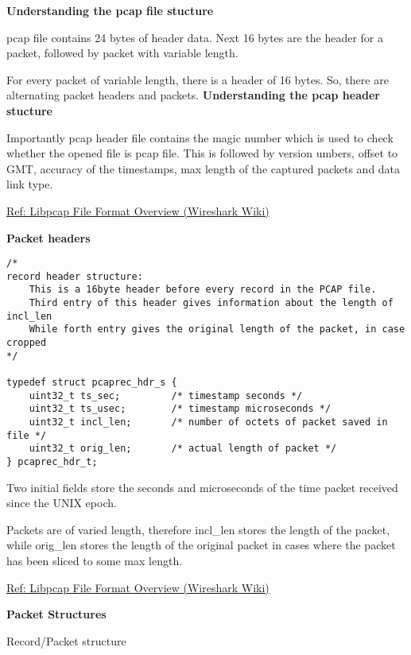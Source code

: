 \documentclass[12pt, a4paper]{report}
\begin{document}
\textbf{Understanding the pcap file stucture}

pcap file contains 24 bytes of header data. Next 16 bytes are the header for a packet, followed by packet with variable length. 

For every packet of variable length, there is a header of 16 bytes. So, there are alternating packet headers and packets.
\newpage
\textbf{Understanding the pcap header stucture}

Importantly pcap header file contains the magic number which is used to check whether the opened file is pcap file.
\newline 
This is followed by version umbers, offset to GMT, accuracy of the timestamps, max length of the captured packets and data link type.

\noindent\href{https://wiki.wireshark.org/Development/LibpcapFileFormat\#overview}{Ref: Libpcap File Format Overview (Wireshark Wiki)}

\vspace{1em}
\textbf{Packet headers}

\begin{lstlisting}[caption={Packet headers}]
/*
record header structure:
    This is a 16byte header before every record in the PCAP file.
    Third entry of this header gives information about the length of incl_len
    While forth entry gives the original length of the packet, in case cropped
*/

typedef struct pcaprec_hdr_s {
    uint32_t ts_sec;         /* timestamp seconds */
    uint32_t ts_usec;        /* timestamp microseconds */
    uint32_t incl_len;       /* number of octets of packet saved in file */
    uint32_t orig_len;       /* actual length of packet */
} pcaprec_hdr_t;
\end{lstlisting}

Two initial fields store the seconds and microseconds of the time packet received since the UNIX epoch.

Packets are of varied length, therefore incl\_len stores the length of the packet, while orig\_len stores the length of the original packet in cases where the packet has been sliced to some max length.

\noindent\href{https://wiki.wireshark.org/Development/LibpcapFileFormat\#overview}{Ref: Libpcap File Format Overview (Wireshark Wiki)}


\newpage
\vspace{1em}
\textbf{Packet Structures}

Record/Packet structure
\end{document}
